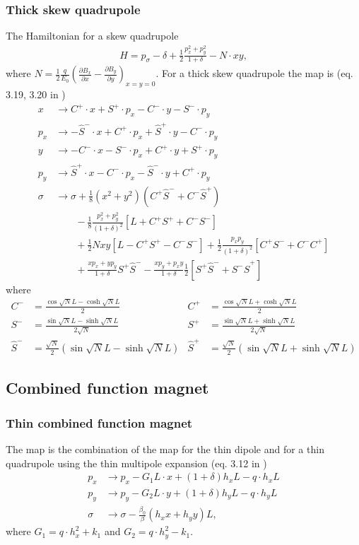 \documentclass[english]{article}
\begin{document}
\subsubsection{Thick skew quadrupole}
The Hamiltonian for a skew quadrupole
\begin{align}
    H = p_\sigma-\delta+\frac{1}{2}\frac{p_x^2+p_y^2}{1+\delta}-N\cdot xy,
\end{align}
where $N=\frac{1}{2}\frac{q}{E_0}\left(\frac{\partial B_x}{\partial x} - 
\frac{\partial B_y}{\partial y}\right)_{x=y=0}$.
For a thick skew quadrupole the map is (eq. 3.19, 3.20 in \cite{ripken85})
\begin{align}
    x &\to C^+\cdot x+S^+\cdot p_x-C^-\cdot y-S^-\cdot p_y \\
    p_x &\to -\hat{S}^-\cdot x+C^+\cdot p_x+\hat{S}^+\cdot y-C^-\cdot p_y \\
    y &\to -C^-\cdot x-S^-\cdot p_x+C^+\cdot y+S^+\cdot p_y \\
    p_y &\to \hat{S}^+\cdot x -C^-\cdot p_x -\hat{S}^-\cdot y + C^+\cdot p_y \\
    \sigma &\to \sigma + \frac{1}{8}(x^2+y^2)\left(C^+\hat{S}^-+C^-\hat{S}^+\right) \\
    &\qquad-\frac{1}{8}\frac{p_x^2+p_y^2}{(1+\delta)^2}\left[L+C^+S^++C^-S^-\right] \\
    &\qquad+\frac{1}{2}Nxy\left[L-C^+S^+-C^-S^-\right] 
    +\frac{1}{2} \frac{p_xp_y}{(1+\delta)^2} \left[C^+S^-+C^-C^+\right] \\
    &\qquad+\frac{xp_x+yp_y}{1+\delta}S^+\hat{S}^--\frac{xp_y+p_xy}{1+\delta}\frac{1}{2}
    \left[S^+\hat{S}^-+S^-\hat{S}^+\right]
\end{align}
where 
\begin{align}
    C^-&=\frac{\cos\sqrt{N}L-\cosh\sqrt{N}L}{2} &
    C^+&=\frac{\cos\sqrt{N}L+\cosh\sqrt{N}L}{2} \\
    S^-&=\frac{\sin\sqrt{N}L-\sinh\sqrt{N}L}{2\sqrt{N}} &
    S^+&=\frac{\sin\sqrt{N}L+\sinh\sqrt{N}L}{2\sqrt{N}} \\
    \hat{S}^-&=\frac{\sqrt{N}}{2}(\sin\sqrt{N}L-\sinh\sqrt{N}L) &
    \hat{S}^+&=\frac{\sqrt{N}}{2}(\sin\sqrt{N}L+\sinh\sqrt{N}L)
\end{align}

\subsection{Combined function magnet}

\subsubsection{Thin combined function magnet}
The map is the combination of the map for the thin dipole and for a thin quadrupole using 
the thin multipole expansion (eq. 3.12 in \cite{ripken95})
\begin{align}
  p_x &\to p_x - G_1 L\cdot x + (1+\delta)h_x L - q\cdot h_xL \\
  p_y &\to p_y - G_2 L \cdot y +(1+\delta) h_y L - q\cdot h_yL\\
  \sigma &\to \sigma - \frac{\beta_0}{\beta}(h_xx+h_yy) L,
\end{align}
where $G_1=q \cdot h_x^2+k_1$ and $G_2=q \cdot h_y^2-k_1$.
\end{document}
